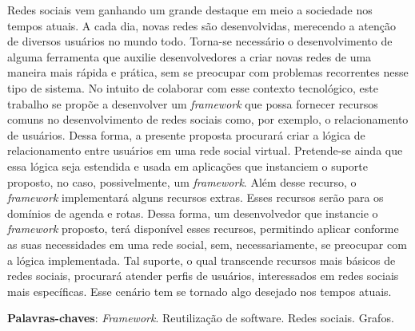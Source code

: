 \begin{resumo}

Redes sociais vem ganhando um grande destaque em meio a sociedade nos tempos atuais. A cada dia, novas redes são desenvolvidas, merecendo a atenção de diversos usuários no mundo todo. Torna-se necessário o desenvolvimento de alguma ferramenta que auxilie desenvolvedores a criar novas redes de uma maneira mais rápida e prática, sem se preocupar com problemas recorrentes nesse tipo de sistema. No intuito de colaborar com esse contexto tecnológico, este trabalho se propõe a desenvolver um \textit{framework} que possa fornecer recursos comuns no desenvolvimento de redes sociais como, por exemplo, o relacionamento de usuários. Dessa forma, a presente proposta procurará criar a lógica de relacionamento entre usuários em uma rede social virtual. Pretende-se ainda que essa lógica seja estendida e usada em aplicações que instanciem o suporte proposto, no caso, possivelmente, um \textit{framework}. Além desse recurso, o \textit{framework} implementará alguns recursos extras. Esses recursos serão para os domínios de agenda e rotas. Dessa forma, um desenvolvedor que instancie o \textit{framework} proposto, terá disponível esses recursos, permitindo aplicar conforme as suas necessidades em uma rede social, sem, necessariamente, se preocupar com a lógica implementada. Tal suporte, o qual transcende recursos mais básicos de redes sociais, procurará atender perfis de usuários, interessados em redes sociais mais específicas. Esse cenário tem se tornado algo desejado nos tempos atuais.

 \vspace{\onelineskip}
    
 \noindent
 \textbf{Palavras-chaves}: \textit{Framework}. Reutilização de software. Redes sociais. Grafos.
\end{resumo}
